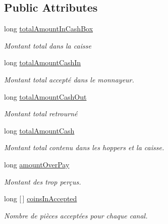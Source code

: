 \subsection*{Public Attributes}
\begin{DoxyCompactItemize}
\item 
long \mbox{\hyperlink{class_device_library_1_1_ccoins_counters_a45bb315e1e87de4c64eaeb5db43fe73e}{total\+Amount\+In\+Cash\+Box}}
\begin{DoxyCompactList}\small\item\em Montant total dans la caisse \end{DoxyCompactList}\item 
long \mbox{\hyperlink{class_device_library_1_1_ccoins_counters_a2f831cbda82d6b8f7af320354d58ed2f}{total\+Amount\+Cash\+In}}
\begin{DoxyCompactList}\small\item\em Montant total accepté dans le monnayeur. \end{DoxyCompactList}\item 
long \mbox{\hyperlink{class_device_library_1_1_ccoins_counters_a94ba3ee5333d441ee3b2c3dc64191676}{total\+Amount\+Cash\+Out}}
\begin{DoxyCompactList}\small\item\em Montant total retrourné \end{DoxyCompactList}\item 
long \mbox{\hyperlink{class_device_library_1_1_ccoins_counters_a92df718cc64594753421a0d4d88750d9}{total\+Amount\+Cash}}
\begin{DoxyCompactList}\small\item\em Montant total contenu dans les hoppers et la caisse. \end{DoxyCompactList}\item 
long \mbox{\hyperlink{class_device_library_1_1_ccoins_counters_acb423a3623dd31ff5d626ded4ca63660}{amount\+Over\+Pay}}
\begin{DoxyCompactList}\small\item\em Montant des trop perçus. \end{DoxyCompactList}\item 
long \mbox{[}$\,$\mbox{]} \mbox{\hyperlink{class_device_library_1_1_ccoins_counters_ae75de715aba60bff644ebd5193c30452}{coins\+In\+Accepted}}
\begin{DoxyCompactList}\small\item\em Nombre de pièces acceptées pour chaque canal. \end{DoxyCompactList}\item 

\end{DoxyCompactItemize}
